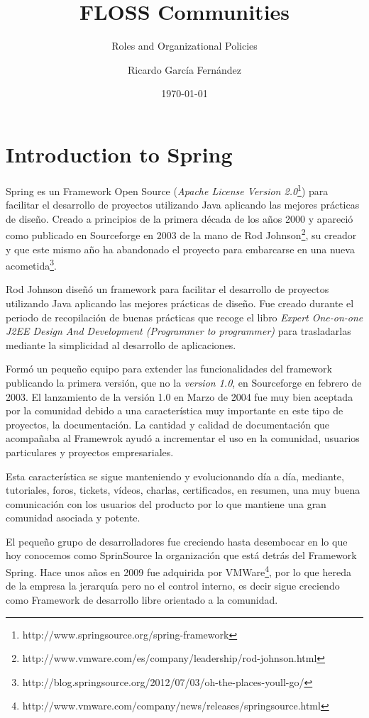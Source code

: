 \documentclass[11pt]{scrartcl}
\title{\textbf{FLOSS Communities}}
\subtitle{Roles and Organizational Policies}
\author{Ricardo García Fernández}
\date{\today}
\begin{document}
\maketitle

\section{Introduction to Spring}

Spring es un Framework Open Source (\emph{Apache License Version 2.0}\footnote{http://www.springsource.org/spring-framework}) para facilitar el desarrollo de proyectos utilizando Java aplicando las mejores pr\'acticas de dise\~no. Creado a principios de la primera d\'ecada de los a\~nos 2000 y apareci\'o como publicado en Sourceforge en 2003 de la mano de Rod Johnson\footnote{http://www.vmware.com/es/company/leadership/rod-johnson.html}, su creador y que este mismo año ha abandonado el proyecto para embarcarse en una nueva acometida\footnote{http://blog.springsource.org/2012/07/03/oh-the-places-youll-go/}.

Rod Johnson diseñó un framework para facilitar el desarrollo de proyectos utilizando Java aplicando las mejores prácticas de diseño. Fue creado durante el periodo de recopilación de buenas prácticas que recoge el libro \emph{Expert One-on-one J2EE Design And Development (Programmer to programmer)} para trasladarlas mediante la simplicidad al desarrollo de aplicaciones.

Formó un pequeño equipo para extender las funcionalidades del framework publicando la primera versión, que no la \emph{version 1.0}, en Sourceforge en febrero de 2003. El lanzamiento de la versión 1.0 en Marzo de 2004 fue muy bien aceptada por la comunidad debido a una característica muy importante en este tipo de proyectos, la documentación. La cantidad y calidad de documentación que acompañaba al Framewrok ayudó a incrementar el uso en la comunidad, usuarios particulares y proyectos empresariales.

Esta característica se sigue manteniendo y evolucionando día a día, mediante, tutoriales, foros, tickets, vídeos, charlas, certificados, en resumen, una muy buena comunicación con los usuarios del producto por lo que mantiene una gran comunidad asociada y potente.

El pequeño grupo de desarrolladores fue creciendo hasta desembocar en lo que hoy conocemos como SprinSource la organización que está detrás del Framework Spring. Hace unos años en 2009 fue adquirida por VMWare\footnote{http://www.vmware.com/company/news/releases/springsource.html}, por lo que hereda de la empresa la jerarquía pero no el control interno, es decir sigue creciendo como Framework de desarrollo libre orientado a la comunidad.
\end{document}
